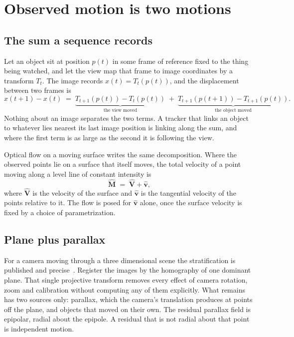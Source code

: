 \chapter{Observed motion is two motions}

\section{The sum a sequence records}

Let an object sit at position $p(t)$ in some frame of reference fixed to the thing being watched,
and let the view map that frame to image coordinates by a transform $T_t$. The image records
$x(t) = T_t(p(t))$, and the displacement between two frames is
\[
x(t+1) - x(t) \;=\; \underbrace{T_{t+1}(p(t)) - T_t(p(t))}_{\text{the view moved}}
\;+\; \underbrace{T_{t+1}(p(t+1)) - T_{t+1}(p(t))}_{\text{the object moved}} .
\]
Nothing about an image separates the two terms. A tracker that links an object to whatever lies
nearest its last image position is linking along the sum, and where the first term is as large as
the second it is following the view.

Optical flow on a moving surface writes the same decomposition. Where the observed points lie on a
surface that itself moves, the total velocity of a point moving along a level line of constant
intensity is
\[
\hat{\mathbf{M}} \;=\; \hat{\mathbf{V}} + \hat{\mathbf{v}},
\]
where $\hat{\mathbf{V}}$ is the velocity of the surface and $\hat{\mathbf{v}}$ is the tangential
velocity of the points relative to it. The flow is posed for $\hat{\mathbf{v}}$ alone, once the
surface velocity is fixed by a choice of parametrization.

\section{Plane plus parallax}

For a camera moving through a three dimensional scene the stratification is published and precise~\cite{src:arXiv-2001-05238}.
Register the images by the homography of one dominant plane. That single projective transform
removes every effect of camera rotation, zoom and calibration without computing any of them
explicitly. What remains has two sources only: parallax, which the camera's translation produces
at points off the plane, and objects that moved on their own. The residual parallax field is
epipolar, radial about the epipole. A residual that is not radial about that point is independent
motion.

